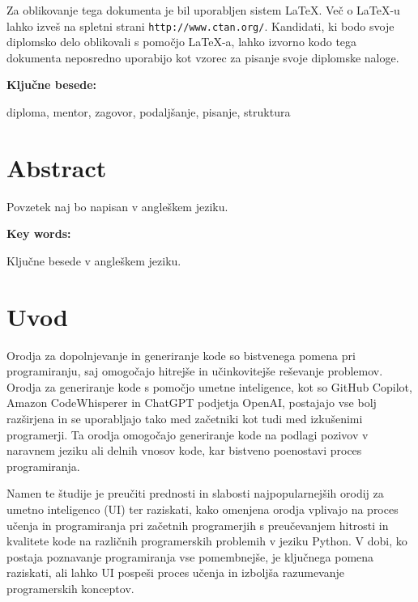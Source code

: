 \documentclass[12pt,a4paper]{book}
\begin{document}
Za oblikovanje tega dokumenta je bil uporabljen sistem \LaTeX.
Ve\v c o \LaTeX-u lahko izve\v s na spletni strani \texttt{http://www.ctan.org/}.
Kandidati, ki bodo svoje diplomsko delo oblikovali s pomo\v cjo
\LaTeX-a, lahko izvorno kodo tega dokumenta neposredno uporabijo kot vzorec za pisanje svoje diplomske naloge.

\vspace{1.3cm}
\noindent
{\large \bf Ključne besede:}

\vspace{0.5cm}
\noindent
diploma, mentor, zagovor, podaljšanje, pisanje, struktura


\chapter*{Abstract}


Povzetek naj bo napisan v angleškem jeziku.

\vspace{1.3cm}
\noindent
{\large \bf Key words:}

\vspace{0.5cm}
\noindent
Ključne besede v angleškem jeziku.



\chapter{Uvod}

Orodja za dopolnjevanje in generiranje kode so bistvenega pomena pri programiranju, saj omogočajo hitrejše in učinkovitejše reševanje problemov. Orodja za generiranje kode s pomočjo umetne inteligence, kot so GitHub Copilot, Amazon CodeWhisperer in ChatGPT podjetja OpenAI, postajajo vse bolj razširjena in se uporabljajo tako med začetniki kot tudi med izkušenimi programerji. Ta orodja omogočajo generiranje kode na podlagi pozivov v naravnem jeziku ali delnih vnosov kode, kar bistveno poenostavi proces programiranja.

Namen te študije je preučiti prednosti in slabosti najpopularnejših orodij za umetno inteligenco (UI) ter raziskati, kako omenjena orodja vplivajo na proces učenja in programiranja pri začetnih programerjih s preučevanjem hitrosti in kvalitete kode na različnih programerskih problemih v jeziku Python. V dobi, ko postaja poznavanje programiranja vse pomembnejše, je ključnega pomena raziskati, ali lahko UI pospeši proces učenja in izboljša razumevanje programerskih konceptov.  
\end{document}
